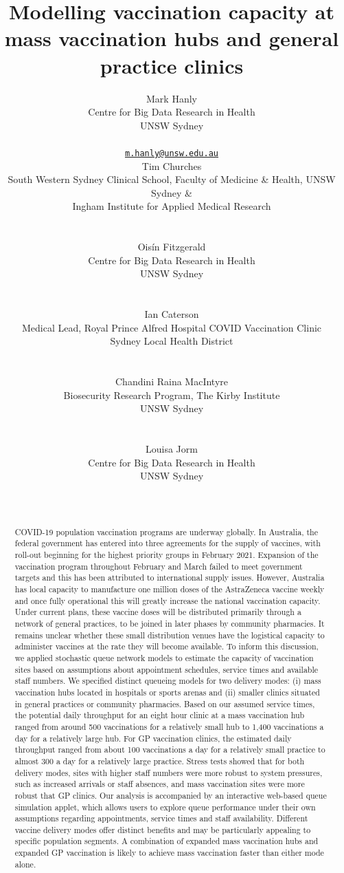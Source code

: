 \documentclass{article}
\title{Modelling vaccination capacity at mass vaccination hubs and general
practice clinics}
\author{
    Mark Hanly
   \\
    Centre for Big Data Research in Health \\
    UNSW Sydney \\
   \\
  \texttt{\href{mailto:m.hanly@unsw.edu.au}{\nolinkurl{m.hanly@unsw.edu.au}}} \\
   \And
    Tim Churches
   \\
    South Western Sydney Clinical School, Faculty of Medicine \& Health,
  UNSW Sydney \& \\
    Ingham Institute for Applied Medical Research \\
   \\
  \texttt{} \\
   \And
    Oisín Fitzgerald
   \\
    Centre for Big Data Research in Health \\
    UNSW Sydney \\
   \\
  \texttt{} \\
   \And
    Ian Caterson
   \\
    Medical Lead, Royal Prince Alfred Hospital COVID Vaccination Clinic \\
    Sydney Local Health District \\
   \\
  \texttt{} \\
   \And
    Chandini Raina MacIntyre
   \\
    Biosecurity Research Program, The Kirby Institute \\
    UNSW Sydney \\
   \\
  \texttt{} \\
   \And
    Louisa Jorm
   \\
    Centre for Big Data Research in Health \\
    UNSW Sydney \\
   \\
  \texttt{} \\
  }
\begin{document}
\maketitle

\def\tightlist{}


\begin{abstract}
COVID-19 population vaccination programs are underway globally. In
Australia, the federal government has entered into three agreements for
the supply of vaccines, with roll-out beginning for the highest priority
groups in February 2021. Expansion of the vaccination program throughout
February and March failed to meet government targets and this has been
attributed to international supply issues. However, Australia has local
capacity to manufacture one million doses of the AstraZeneca vaccine
weekly and once fully operational this will greatly increase the
national vaccination capacity. Under current plans, these vaccine doses
will be distributed primarily through a network of general practices, to
be joined in later phases by community pharmacies. It remains unclear
whether these small distribution venues have the logistical capacity to
administer vaccines at the rate they will become available. To inform
this discussion, we applied stochastic queue network models to estimate
the capacity of vaccination sites based on assumptions about appointment
schedules, service times and available staff numbers. We specified
distinct queueing models for two delivery modes: (i) mass vaccination
hubs located in hospitals or sports arenas and (ii) smaller clinics
situated in general practices or community pharmacies. Based on our
assumed service times, the potential daily throughput for an eight hour
clinic at a mass vaccination hub ranged from around 500 vaccinations for
a relatively small hub to 1,400 vaccinations a day for a relatively
large hub. For GP vaccination clinics, the estimated daily throughput
ranged from about 100 vaccinations a day for a relatively small practice
to almost 300 a day for a relatively large practice. Stress tests showed
that for both delivery modes, sites with higher staff numbers were more
robust to system pressures, such as increased arrivals or staff
absences, and mass vaccination sites were more robust that GP clinics.
Our analysis is accompanied by an interactive web-based queue simulation
applet, which allows users to explore queue performance under their own
assumptions regarding appointments, service times and staff
availability. Different vaccine delivery modes offer distinct benefits
and may be particularly appealing to specific population segments. A
combination of expanded mass vaccination hubs and expanded GP
vaccination is likely to achieve mass vaccination faster than either
mode alone.
\end{abstract}
\end{document}
